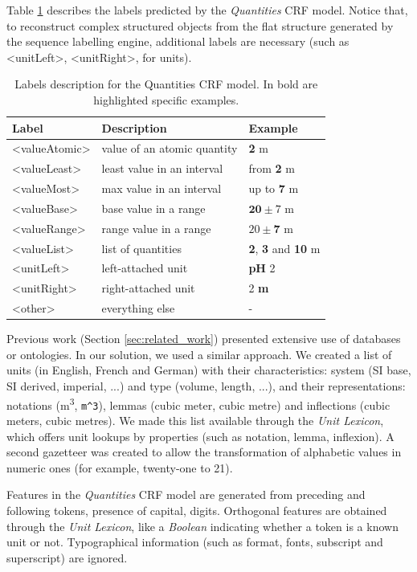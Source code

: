 \documentclass[sigconf]{acmart}
\begin{document}
Table \ref{tab:quantities-model-labels} describes the labels predicted by the \textit{Quantities} CRF model. Notice that, to reconstruct complex structured objects from the flat structure generated by the sequence labelling engine, additional labels are necessary (such as <unitLeft>, <unitRight>, for units).

\begin{table}[ht]
  \caption{Labels description for the Quantities CRF model. In bold are highlighted specific examples.}
  \label{tab:quantities-model-labels}
  \begin{tabular}{lll}
    \toprule
    Label & Description & Example\\
    \midrule
    <valueAtomic> & value of an atomic quantity & \textbf{2} m \\
    <valueLeast> & least value in an interval & from \textbf{2} m \\
    <valueMost> & max value in an interval & up to \textbf{7} m \\
    <valueBase> & base value in a range & $\textbf{20}\pm7$ m \\
    <valueRange> & range value in a range & $20 \pm \textbf{7}$ m \\
    <valueList> & list of quantities & \textbf{2}, \textbf{3} and \textbf{10} m \\
    <unitLeft> & left-attached unit & \textbf{pH} 2 \\
    <unitRight> & right-attached unit & 2 \textbf{m} \\
    <other> & everything else & - \\
  \bottomrule
\end{tabular}
\end{table}

Previous work (Section \ref{sec:related_work}) presented extensive use of databases or ontologies. In our solution, we used a similar approach. We created a list of units (in English, French and German) with their characteristics: system (SI base, SI derived, imperial, ...) and type (volume, length, ...), and their representations: notations (m\textsuperscript{3}, \texttt{m\^{}3}), lemmas (cubic meter, cubic metre) and inflections (cubic meters, cubic metres). We made this list available through the \textit{Unit Lexicon}, which offers unit lookups by properties (such as notation, lemma, inflexion). A second gazetteer was created to allow the transformation of alphabetic values in numeric ones (for example, twenty-one to 21).

Features in the \textit{Quantities} CRF model are generated from preceding and following tokens, presence of capital, digits. Orthogonal features are obtained through the \textit{Unit Lexicon}, like a \textit{Boolean} indicating whether a token is a known unit or not. Typographical information (such as format, fonts, subscript and superscript) are ignored. 
\end{document}
